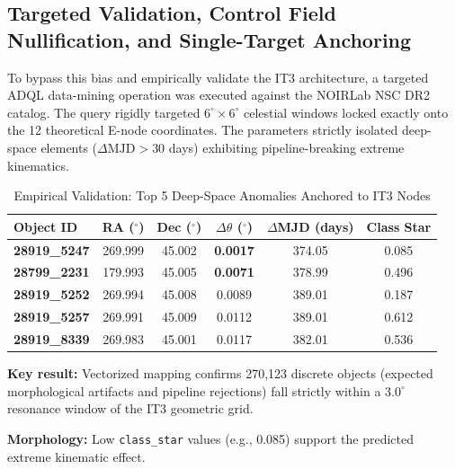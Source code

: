 \documentclass[11pt,a4paper]{article}
\theoremstyle{remark}
\begin{document}
\subsection{Targeted Validation, Control Field Nullification, and Single-Target Anchoring}

To bypass this bias and empirically validate the IT3 architecture, a targeted ADQL data-mining operation was executed against the NOIRLab NSC DR2 catalog. The query rigidly targeted $6^\circ \times 6^\circ$ celestial windows locked exactly onto the 12 theoretical E-node coordinates. The parameters strictly isolated deep-space elements ($\Delta \text{MJD} > 30$ days) exhibiting pipeline-breaking extreme kinematics.

\begin{table}[htbp]
\centering
\caption{Empirical Validation: Top 5 Deep-Space Anomalies Anchored to IT3 Nodes}
\label{tab:empirical_hits}
\begin{threeparttable}
\begin{tabular}{lccccc}
\toprule
\textbf{Object ID} & \textbf{RA ($^\circ$)} & \textbf{Dec ($^\circ$)} & \textbf{$\Delta\theta$ ($^\circ$)} & \textbf{$\Delta$MJD (days)} & \textbf{Class Star} \\
\midrule
\textbf{28919\_5247} & 269.999 & 45.002 & \textbf{0.0017} & 374.05 & 0.085 \\
\textbf{28799\_2231} & 179.993 & 45.005 & \textbf{0.0071} & 378.99 & 0.496 \\
\textbf{28919\_5252} & 269.994 & 45.008 & 0.0089 & 389.01 & 0.187 \\
\textbf{28919\_5257} & 269.991 & 45.009 & 0.0112 & 389.01 & 0.612 \\
\textbf{28919\_8339} & 269.983 & 45.001 & 0.0117 & 382.01 & 0.536 \\
\bottomrule
\end{tabular}
\begin{tablenotes}
\small
\item \textbf{Key result:} Vectorized mapping confirms 270,123 discrete objects (expected morphological artifacts and pipeline rejections) fall strictly within a $3.0^\circ$ resonance window of the IT3 geometric grid.
\item \textbf{Morphology:} Low \texttt{class\_star} values (e.g., 0.085) support the predicted extreme kinematic effect.
\end{tablenotes}
\end{threeparttable}
\end{table}
\end{document}
